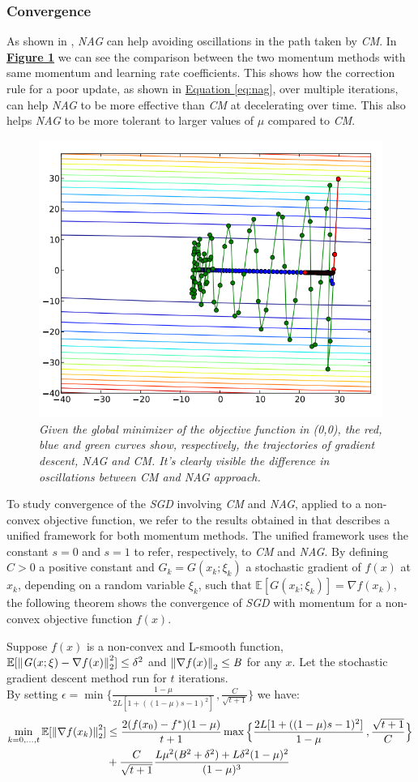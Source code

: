 \subsubsection{Convergence}
\label{conv_mom}
As shown in \cite{momentum}, \textit{NAG} can help avoiding oscillations in the path taken by \textit{CM}. In \hyperref[fig:convNAGvsCM]{\textbf{Figure \ref{fig:convNAGvsCM}}} we can see the comparison between the two momentum methods with same momentum and learning rate coefficients. This shows how the correction rule for a poor update, as shown in \hyperref[eq:nag]{Equation \ref{eq:nag}}, over multiple iterations, can help \textit{NAG} to be more effective than \textit{CM} at decelerating over time. This also helps \textit{NAG} to be more tolerant to larger values of $\mu$ compared to \textit{CM}.
\begin{figure}[H]
	\centering
	\includegraphics[width=0.35\linewidth]{res/convNAGvsCM.png}
	\caption{\textit{Given the global minimizer of the objective function in (0,0), the red, blue and green curves show, respectively, the trajectories of \textit{gradient descent}, \textit{NAG} and \textit{CM}. It's clearly visible the difference in oscillations between \textit{CM} and \textit{NAG} approach.}}
	\label{fig:convNAGvsCM}
\end{figure}
To study convergence of the \textit{SGD} involving \textit{CM} and \textit{NAG}, applied to a non-convex objective function, we refer to the results obtained in \cite{sgdunified} that describes a unified framework for both momentum methods. The unified framework uses the constant $s=0$ and $s=1$ to refer, respectively, to \textit{CM} and \textit{NAG}. By defining $C>0$ a positive constant and $\mathit{G}_k = \mathit{G}(x_k; \xi_k)$ a stochastic gradient  of $f(x)$ at $x_k$, depending on a random variable $\xi_k$, such that ${\mathbb{E}[\mathit{G}(x_k;\xi_k)] = \nabla f(x_k)}$, the following theorem shows the convergence of \textit{SGD} with momentum for a non-convex objective function $f(x)$.
\begin{thm}
\label{thm:convmom}
Suppose $f(x)$ is a non-convex and L-smooth function, ${\mathbb{E}[\left\lVert \mathit{G}(x;\xi)-\nabla f(x) \right\rVert_2^2]\leq\delta^2}$ and $\left\lVert \nabla f(x) \right\rVert_2\leq\mathit{B}$ for any $x$. Let the stochastic gradient descent method run for $t$ iterations.\\By setting $\epsilon = \min\{\frac{1-\mu}{2L[1+((1-\mu)s-1)^2]}\,,\frac{C}{\sqrt{t+1}}\}$ we have:
\begin{align*}
    \min_{k=0,...,t}\mathbb{E}[\left\lVert \nabla f(x_k) \right\rVert_2^2] &\leq \frac{2(f(x_0)-f^*)(1-\mu)}{t+1}\max\Big\{\frac{2L[1+((1-\mu)s-1)^2]}{1-\mu}\,,\frac{\sqrt{t+1}}{C}\Big\}\\
    &+\frac{C}{\sqrt{t+1}}\frac{L\mu^2(\mathit{B}^2+\delta^2)+L\delta^2(1-\mu)^2}{(1-\mu)^3}
\end{align*}
\end{thm}
